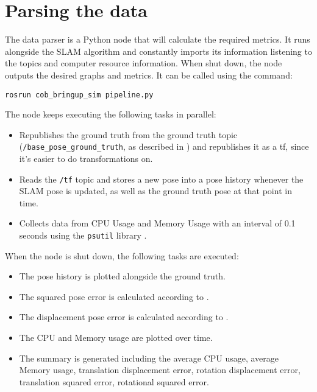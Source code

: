 \section{Parsing the data}

The data parser is a Python node that will calculate the required metrics. It runs alongside the SLAM algorithm and constantly imports its information listening to the topics and computer resource information. When shut down, the node outputs the desired graphs and metrics. It can be called using the command:

\begin{verbatim}
rosrun cob_bringup_sim pipeline.py
\end{verbatim}

The node keeps executing the following tasks in parallel:

\begin{itemize}
    \item Republishes the ground truth from the ground truth topic (\texttt{/base\_pose\_ground\_truth}, as described in ) and republishes it as a tf, since it's easier to do transformations on. 
    \item Reads the \texttt{/tf} topic and stores a new pose into a pose history whenever the SLAM pose is updated, as well as the ground truth pose at that point in time.
    \item Collects data from CPU Usage and Memory Usage with an interval of 0.1 seconds using the \texttt{psutil} library \cite{psutil}.
\end{itemize}

When the node is shut down, the following tasks are executed:

\begin{itemize}
    \item The pose history is plotted alongside the ground truth.
    \item The squared pose error is calculated according to .
    \item The displacement pose error is calculated according to .
    \item The CPU and Memory usage are plotted over time.
    \item The summary is generated including the average CPU usage, average Memory usage, translation displacement error, rotation displacement error, translation squared error, rotational squared error.
\end{itemize}

